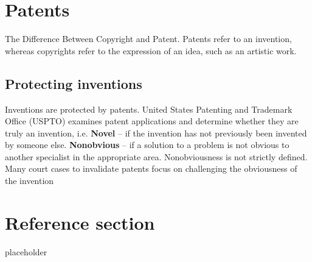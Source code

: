 \documentclass{article}
\begin{document}
\section{Patents}
\begin{flushleft}
The Difference Between Copyright and Patent. Patents refer to an invention, whereas copyrights refer to the expression of an idea, such as an artistic work. 
\end{flushleft}

\subsection{Protecting inventions}

\begin{flushleft}
Inventions are protected by patents. United States Patenting and Trademark Office (USPTO) examines patent applications and determine whether they are truly an invention, i.e. \textbf{Novel} – if the invention has not previously been invented by someone else. \textbf{Nonobvious} – if a solution to a problem is not obvious to another specialist in the appropriate area. Nonobviousness is not strictly defined. Many court cases to invalidate patents focus on challenging the obviousness of the invention
\end{flushleft}

\pagebreak

\section*{Reference section} \label{sec:reference}
\begin{description}
	\item[placeholder] \hfill \\
\end{description}
\end{document}
